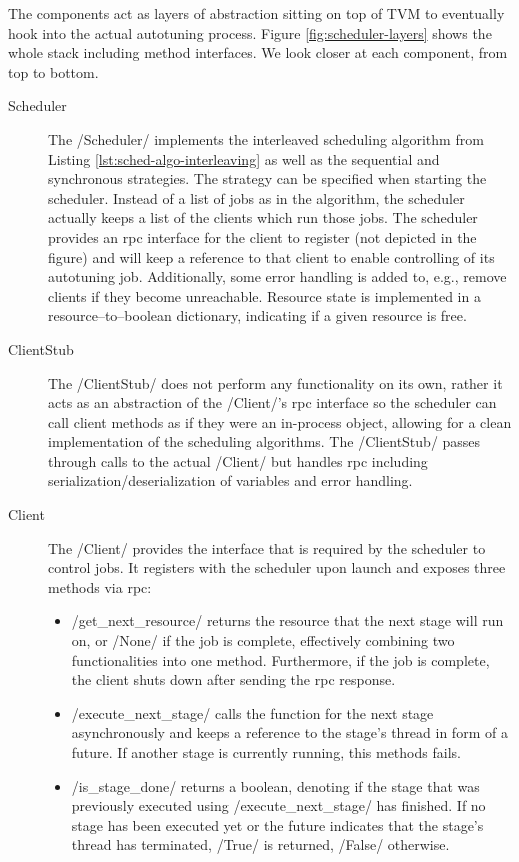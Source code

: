 The components act as layers of abstraction sitting on top of TVM to eventually hook into the actual autotuning process. Figure \ref{fig:scheduler-layers} shows the whole stack including method interfaces. We look closer at each component, from top to bottom.
\begin{description}
	\item[Scheduler] The \pythoninline/Scheduler/ implements the interleaved scheduling algorithm from Listing \ref{lst:sched-algo-interleaving} as well as the sequential and synchronous strategies. The strategy can be specified when starting the scheduler. Instead of a list of jobs as in the algorithm, the scheduler actually keeps a list of the clients which run those jobs. The scheduler provides an \gls{rpc} interface for the client to register (not depicted in the figure) and will keep a reference to that client to enable controlling of its autotuning job. Additionally, some error handling is added to, e.g., remove clients if they become unreachable. Resource state is implemented in a resource--to--boolean dictionary, indicating if a given resource is free.
	\item[ClientStub] The \pythoninline/ClientStub/ does not perform any functionality on its own, rather it acts as an abstraction of the \pythoninline/Client/'s \gls{rpc} interface so the scheduler can call client methods as if they were an in-process object, allowing for a clean implementation of the scheduling algorithms. The \pythoninline/ClientStub/ passes through calls to the actual \pythoninline/Client/ but handles \gls{rpc} including serialization/deserialization of variables and error handling.
	\item[Client] The \pythoninline/Client/ provides the interface that is required by the scheduler to control jobs. It registers with the scheduler upon launch and exposes three methods via \gls{rpc}:
	\begin{itemize}
		\item \pythoninline/get_next_resource/ returns the resource that the next stage will run on, or \pythoninline/None/ if the job is complete, effectively combining two functionalities into one method. Furthermore, if the job is complete, the client shuts down after sending the \gls{rpc} response.
		\item \pythoninline/execute_next_stage/ calls the function for the next stage asynchronously and keeps a reference to the stage's thread in form of a future. If another stage is currently running, this methods fails.
		\item \pythoninline/is_stage_done/ returns a boolean, denoting if the stage that was previously executed using \pythoninline/execute_next_stage/ has finished. If no stage has been executed yet or the future indicates that the stage's thread has terminated,  \pythoninline/True/ is returned,  \pythoninline/False/ otherwise.

\end{itemize}
\end{description}
